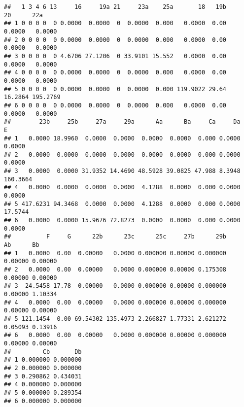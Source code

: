 \documentclass[
]{article}
\begin{document}
\begin{verbatim}
##   1 3 4 6 13     16     19a 21     23a    25a       18   19b      20      22a
## 1 0 0 0 0  0 0.0000  0.0000  0  0.0000  0.000   0.0000  0.00  0.0000   0.0000
## 2 0 0 0 0  0 0.0000  0.0000  0  0.0000  0.000   0.0000  0.00  0.0000   0.0000
## 3 0 0 0 0  0 4.6706 27.1206  0 33.9101 15.552   0.0000  0.00  0.0000   0.0000
## 4 0 0 0 0  0 0.0000  0.0000  0  0.0000  0.000   0.0000  0.00  0.0000   0.0000
## 5 0 0 0 0  0 0.0000  0.0000  0  0.0000  0.000 119.9022 29.64 16.2864 195.2769
## 6 0 0 0 0  0 0.0000  0.0000  0  0.0000  0.000   0.0000  0.00  0.0000   0.0000
##        23b     25b     27a     29a      Aa      Ba     Ca     Da        E
## 1   0.0000 18.9960  0.0000  0.0000  0.0000  0.0000  0.000 0.0000   0.0000
## 2   0.0000  0.0000  0.0000  0.0000  0.0000  0.0000  0.000 0.0000   0.0000
## 3   0.0000  0.0000 31.9352 14.4690 48.5928 39.0825 47.988 8.3948 160.3664
## 4   0.0000  0.0000  0.0000  0.0000  4.1288  0.0000  0.000 0.0000   0.0000
## 5 417.6231 94.3468  0.0000  0.0000  4.1288  0.0000  0.000 0.0000  17.5744
## 6   0.0000  0.0000 15.9676 72.8273  0.0000  0.0000  0.000 0.0000   0.0000
##          F     G      22b      23c      25c     27b      29b      Ab      Bb
## 1   0.0000  0.00  0.00000   0.0000 0.000000 0.00000 0.000000 0.00000 0.00000
## 2   0.0000  0.00  0.00000   0.0000 0.000000 0.00000 0.175308 0.00000 0.00000
## 3  24.5458 17.78  0.00000   0.0000 0.000000 0.00000 0.000000 0.00000 1.10334
## 4   0.0000  0.00  0.00000   0.0000 0.000000 0.00000 0.000000 0.00000 0.00000
## 5 121.1454  0.00 69.54302 135.4973 2.266827 1.77331 2.621272 0.05093 0.13916
## 6   0.0000  0.00  0.00000   0.0000 0.000000 0.00000 0.000000 0.00000 0.00000
##         Cb       Db
## 1 0.000000 0.000000
## 2 0.000000 0.000000
## 3 0.290862 0.434031
## 4 0.000000 0.000000
## 5 0.000000 0.289354
## 6 0.000000 0.000000
\end{verbatim}
\end{document}
